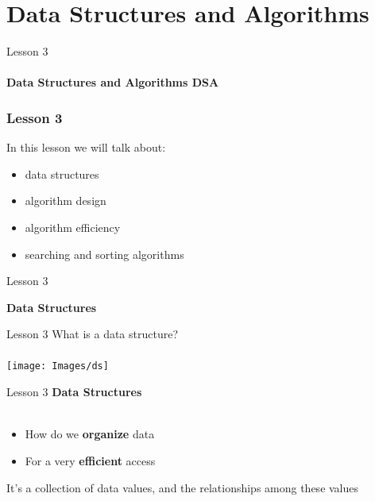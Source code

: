 \documentclass[aspectratio=1610]{beamer}
\begin{document}
\section{Data Structures and Algorithms}

\begin{frame}
\begin{center}
\Huge Lesson 3\\~\\
\textbf{Data Structures and Algorithms DSA}
\end{center}
\end{frame}


\begin{frame}
\frametitle{Lesson 3}

\huge In this lesson we will talk about:
\begin{itemize}
	\item \alert{data structures}
	\item \alert{algorithm design}
	\item \alert{algorithm efficiency}
	\item \alert{searching and sorting algorithms}
\end{itemize}
\end{frame}


\begin{frame}{Lesson 3}{}
\begin{center}
\Huge \textbf{Data Structures}
\end{center}
\end{frame}


\begin{frame}{Lesson 3}{}
\Huge{What is a data structure?}\\~\\
\texttt{[image: Images/ds]}
\end{frame}


\begin{frame}{Lesson 3}{}
\LARGE
\textbf{Data Structures}\\~\\
\begin{itemize}
    \item How do we \textbf{organize} data
    \item For a very \textbf{efficient} access
\end{itemize}

It's a collection of data values, and the relationships among these values
\end{frame}
\end{document}
